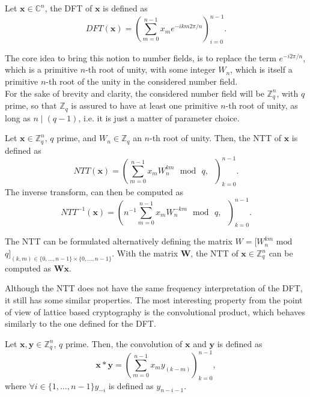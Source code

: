 \begin{definition}
Let $\mathbf{x}\in\mathbb{C}^n$, the DFT of $\mathbf{x}$ is defined as
\begin{equation*}
DFT(\mathbf{x})=\left(\sum_{m=0}^{n-1}x_me^{-ikm2\pi/n} \right)_{i=0}^{n-1}.
\end{equation*}
\end{definition}

The core idea to bring this notion to number fields, is to replace the term $e^{-i2\pi/n}$, which is a primitive $n$-th root of unity, with some integer $W_n$, which is itself a primitive $n$-th root of the unity in the considered number field.\\
For the sake of brevity and clarity, the considered number field will be $\mathbb{Z}_q^n$, with $q$ prime, so that $\mathbb{Z}_q$ is assured to have at least one primitive $n$-th root of unity, as long as $n\mid(q-1)$, i.e. it is just a matter of parameter choice.

\begin{definition}[NTT]
Let $\mathbf{x}\in\mathbb{Z}_q^n$, $q$ prime, and $W_n\in\mathbb{Z}_q$ an $n$-th root of unity. Then, the NTT of $\mathbf{x}$ is defined as
\begin{equation*}
NTT(\mathbf{x})=\left(\sum_{m=0}^{n-1}x_mW_n^{km}\text{ }\mathrm{mod}\text{ }q,\text{ }\right)_{k=0}^{n-1}.
\end{equation*}
The inverse transform, can then be computed as
\begin{equation*}
NTT^{-1}(\mathbf{x})=\left(n^{-1}\sum_{m=0}^{n-1}x_mW_n^{-km}\text{ }\mathrm{mod}\text{ }q,\text{ }\right)_{k=0}^{n-1}.
\end{equation*} 
\end{definition}

\begin{remark}
The NTT can be formulated alternatively defining the matrix $W=[W_n^{km}$ $\mathrm{mod}$ $q]_{(k,m)\in\{0,\ldots,n-1\}\times\{0,\ldots,n-1\}}$. With the matrix $\mathbf{W}$, the NTT of $\mathbf{x}\in\mathbb{Z}_q^n$ can be computed as $\mathbf{Wx}$.
\end{remark}

Although the NTT does not have the same frequency interpretation of the DFT, it still has some similar properties. The most interesting property from the point of view of lattice based cryptography is the convolutional product, which behaves similarly to the one defined for the DFT.

\begin{definition}
Let $\mathbf{x},\mathbf{y}\in\mathbb{Z}_q^n$, $q$ prime. Then, the convolution of $\mathbf{x}$ and $\mathbf{y}$ is defined as
\begin{equation*}
\mathbf{x}\ast\mathbf{y} = \left(\sum_{m=0}^{n-1}x_{m}y_{(k-m)}\right)_{k=0}^{n-1},
\end{equation*}
where $\forall i \in \{1,\ldots,n-1\} y_{-i}$ is defined as $y_{n-i-1}$. 
\end{definition}

